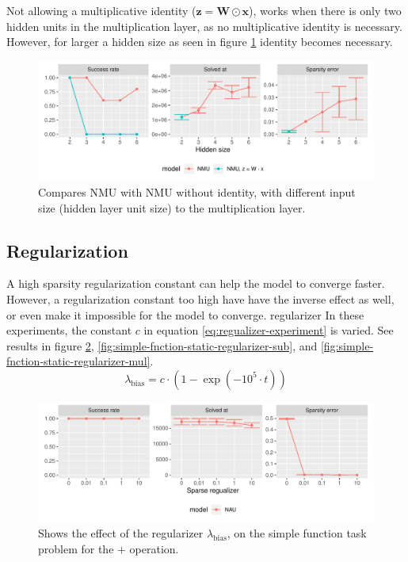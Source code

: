 Not allowing a multiplicative identity ($\mathbf{z} = \mathbf{W} \odot \mathbf{x}$), works when there is only two hidden units in the multiplication layer, as no multiplicative identity is necessary. However, for larger a hidden size as seen in figure \ref{fig:simple-function-static-ablation-hidden-size} identity becomes necessary.
\begin{figure}[h]
\centering
\includegraphics[width=\linewidth]{results/simple_function_static_ablation_hidden_size.pdf}
\caption{Compares NMU with NMU without identity, with different input size (hidden layer unit size) to the multiplication layer.}
\label{fig:simple-function-static-ablation-hidden-size}
\end{figure}

\subsection{Regularization}
\label{sec:appendix:simple-function-task:regualization}
A high sparsity regularization constant can help the model to converge faster. However, a regularization constant too high have have the inverse effect as well, or even make it impossible for the model to converge.
regularizer
In these experiments, the constant $c$ in equation \ref{eq:regualizer-experiment} is varied. See results in figure \ref{fig:simple-fnction-static-regularizer-add}, \ref{fig:simple-fnction-static-regularizer-sub}, and \ref{fig:simple-fnction-static-regularizer-mul}.
\begin{equation}
\lambda_{\mathrm{bias}} = c \cdot (1 - \exp(-10^5 \cdot t))
\label{eq:regualizer-experiment}
\end{equation}

\begin{figure}[h]
\centering
\includegraphics[width=\linewidth]{results/simple_function_static_regualization_add.pdf}
\caption{Shows the effect of the regularizer $\lambda_{\mathrm{bias}}$, on the simple function task problem for the $\bm{+}$ operation.}
\label{fig:simple-fnction-static-regularizer-add}
\end{figure}

